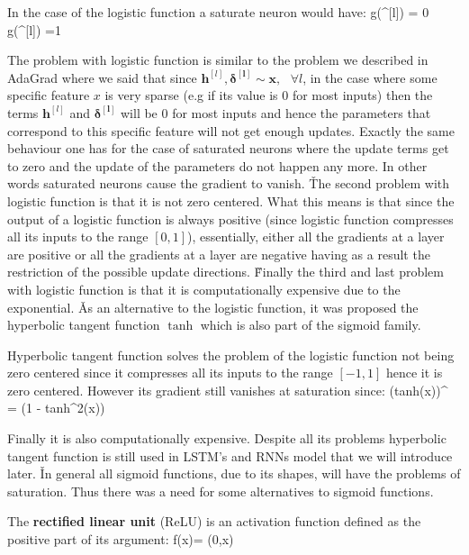 In the case of the logistic function a saturate neuron would have:
\bse
g({}^{[l]}) = 0 \quad {} \quad g({}^{[l]}) =1
\ese

The problem with logistic function is similar to the problem we described in AdaGrad where we said that since 
${\boldsymbol{h}^{[l]}}, \boldsymbol{\delta^{[l]}} \sim \boldsymbol{x}, \:\:\: \forall l$, in the case where some 
specific feature $x$ is very sparse (e.g if its value is 0 for most inputs) then the terms ${\boldsymbol{h}^{[l]}}$ 
and $\boldsymbol{\delta^{[l]}}$ will be 0 for most inputs and hence the parameters that correspond to this specific 
feature will not get enough updates. Exactly the same behaviour one has for the case of saturated neurons where the 
update terms get to zero and the update of the parameters do not happen any more. In other words saturated neurons 
cause the gradient to vanish. \v

The second problem with logistic function is that it is not zero centered. What this means is that since the output 
of a logistic function is always positive (since logistic function compresses all its inputs to the range $[0,1]$), 
essentially, either all the gradients at a layer are positive or all the gradients at a layer are negative having as 
a result the restriction of the possible update directions. \v

Finally the third and last problem with logistic function is that it is computationally expensive due to the 
exponential. \v

As an alternative to the logistic function, it was proposed the hyperbolic tangent function $\tanh$ which is also 
part of the sigmoid family.


Hyperbolic tangent function solves the problem of the logistic function not being zero centered since it compresses 
all its inputs to the range $[-1,1]$ hence it is zero centered. However its gradient still vanishes at saturation since:
\bse
(tanh(x))^{\prime} = (1 - tanh^{2}(x))
\ese

Finally it is also computationally expensive. Despite all its problems hyperbolic tangent function is still used in 
LSTM's and RNNs model that we will introduce later. \v

In general all sigmoid functions, due to its shapes, will have the problems of saturation. Thus there was a need for 
some alternatives to sigmoid functions.

The \textbf{rectified linear unit }(ReLU) is an activation function defined as the positive part of its argument:
\bse
f(x)= \max(0,x)
\ese

